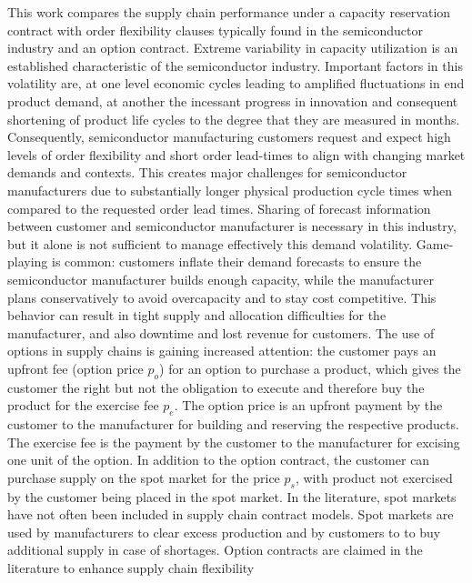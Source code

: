 \documentclass[12pt,english]{article}
\begin{document}
This work compares the supply chain performance under a capacity reservation
contract with order flexibility clauses typically found in the semiconductor
industry and an option contract. Extreme variability in capacity utilization
is an established characteristic of the semiconductor industry. Important
factors in this volatility are, at one level economic cycles leading
to amplified fluctuations in end product demand, at another the incessant
progress in innovation and consequent shortening of product life cycles
to the degree that they are measured in months.  
Consequently, semiconductor
manufacturing customers request and expect high levels of order flexibility
and short order lead-times to align with changing market demands and
contexts. This creates major challenges for semiconductor manufacturers
due to substantially longer physical production cycle times when compared
to the requested order lead times. Sharing of forecast information
between customer and semiconductor manufacturer is necessary in this
industry, but it alone is not sufficient to manage effectively this
demand volatility. Game-playing is common: customers inflate their
demand forecasts to ensure the semiconductor manufacturer builds enough
capacity, while the manufacturer plans conservatively to avoid overcapacity
and to stay cost competitive. This behavior can result in tight supply
and allocation difficulties for the manufacturer, and also downtime
and lost revenue for customers. The use of options in supply chains
is gaining increased attention: the customer pays an upfront fee (option
price $p_{o}$) for an option to purchase a product, which gives the
customer the right but not the obligation to execute and therefore
buy the product for the exercise fee $p_{e}$. The option price is
an upfront payment by the customer to the manufacturer for building
and reserving the respective products. The exercise fee is the payment
by the customer to the manufacturer for excising one unit of the option.
In addition to the option contract, the customer can purchase supply
on the spot market for the  price $p_{s}$, with product not exercised  by the customer being placed in the spot market. In the literature,
spot markets have not often been included in supply chain contract
models.  %
Spot markets are used by manufacturers to clear excess production and by customers
to to buy additional supply in case of shortages. Option contracts
are claimed in the literature to enhance supply chain flexibility
\end{document}
